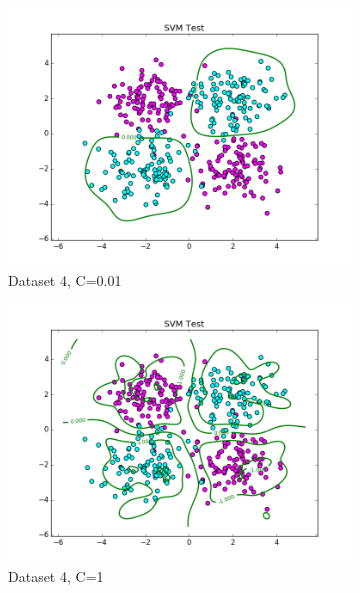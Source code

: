 \documentclass[10pt,twoside]{article}
\begin{document}
\begin{figure}[h]
        \begin{subfigure}[b]{0.33\textwidth}
                \centering
                \includegraphics[width=\linewidth]{Figures/P2/RBF_data4_test_g1C-2.png}
                \caption{Dataset 4, C=0.01}
        \end{subfigure}%
        \begin{subfigure}[b]{0.33\textwidth}
                \centering
                \includegraphics[width=\linewidth]{Figures/P2/RBF_data4_test_g1C1.png}
                \caption{Dataset 4, C=1}
        \end{subfigure}%
        \begin{subfigure}[b]{0.33\textwidth}

\end{subfigure}
\end{figure}
\end{document}

